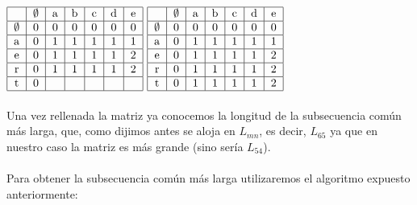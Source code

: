 \documentclass{article}
\begin{document}
\begin{center}
			    \)
	    		\hspace{.1in}
	    		\(
				\begin{tabular}{ | c | c | c | c | c | c | c | }
	    				\hline
					   & $\emptyset$ & a & b  & c  & d & e \\ \hline
					$\emptyset$ & 0 & 0 & 0  & 0  & 0 & 0  \\ \hline
					a & 0 & 1 & 1 & 1 & 1 & 1 \\ \hline
					e & 0 & 1 & 1 & 1 & 1 & 2 \\ \hline
					r & 0 & 1 & 1 & 1 & 1 & 2 \\ \hline
					t & 0  &   &    &    &   &    \\
					\hline
				\end{tabular}
			    \)
	    		\hspace{.1in}
	    		\(
				\begin{tabular}{ | c | c | c | c | c | c | c | }
	    				\hline
					   & $\emptyset$ & a & b  & c  & d & e \\ \hline
					$\emptyset$ & 0 & 0 & 0  & 0  & 0 & 0  \\ \hline
					a & 0 & 1 & 1 & 1 & 1 & 1 \\ \hline
					e & 0 & 1 & 1 & 1 & 1 & 2 \\ \hline
					r & 0 & 1 & 1 & 1 & 1 & 2 \\ \hline
					t & 0  & 1 & 1 & 1 & 1 & 2 \\
					\hline
				\end{tabular}
		    	\)
			\end{center}

			\paragraph{}
			Una vez  rellenada la matriz ya conocemos la longitud de la subsecuencia común más larga, que, como dijimos antes se aloja en $L_{mn}$, es decir, $L_{65}$ ya que en nuestro caso la matriz es más grande (sino sería $L_{54}$).

			\paragraph{}
			Para obtener la subsecuencia común más larga utilizaremos el algoritmo expuesto anteriormente:
\end{document}
